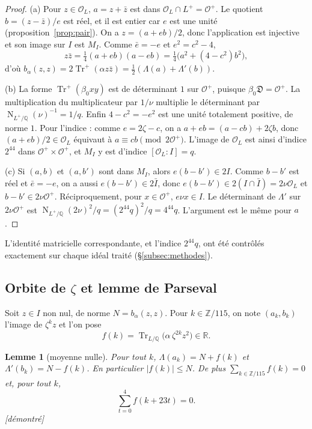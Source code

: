 \documentclass[11pt,a4paper]{amsart}
\theoremstyle{plain}
\newtheorem{lemme}[theoreme]{Lemme}
\theoremstyle{definition}
\numberwithin{equation}{section}
\newcommand{\Q}{\mathbb{Q}}
\newcommand{\Z}{\mathbb{Z}}
\newcommand{\R}{\mathbb{R}}
\newcommand{\OO}{\mathcal{O}}
\newcommand{\Op}{\mathcal{O}^{+}}
\newcommand{\Dif}{\mathfrak{D}}
\DeclareMathOperator{\Tr}{Tr}
\DeclareMathOperator{\Nm}{N}
\newcommand{\Trp}{\Tr^{+}}
\newcommand{\st}[1]{\textup{\textsf{\small[#1]}}}
\newcommand{\DEM}{\st{démontré}}
\begin{document}
\begin{proof}
(a) Pour $z\in\OO_L$, $a=z+\bar z$ est dans $\OO_L\cap L^+=\Op$. Le quotient $b=(z-\bar z)/e$ est réel, et il est entier car $e$ est une unité (proposition~\ref{prop:pair}). On a $z=(a+eb)/2$, donc l'application est injective et son image sur $I$ est $M_I$. Comme $\bar e=-e$ et $e^2=c^2-4$,
\[
z\bar z=\tfrac14(a+eb)(a-eb)=\tfrac14\bigl(a^2+(4-c^2)b^2\bigr),
\]
d'où $b_\alpha(z,z)=2\Trp(\alpha z\bar z)=\frac12(\Lambda(a)+\Lambda'(b))$.

(b) La forme $\Trp(\beta_0xy)$ est de déterminant $1$ sur $\Op$, puisque $\beta_0\Dif=\Op$. La multiplication du multiplicateur par $1/\nu$ multiplie le déterminant par $\Nm_{L^+/\Q}(\nu)^{-1}=1/q$. Enfin $4-c^2=-e^2$ est une unité totalement positive, de norme $1$. Pour l'indice : comme $e=2\zeta-c$, on a $a+eb=(a-cb)+2\zeta b$, donc $(a+eb)/2\in\OO_L$ équivaut à $a\equiv cb\pmod{2\Op}$. L'image de $\OO_L$ est ainsi d'indice $2^{44}$ dans $\Op\times\Op$, et $M_I$ y est d'indice $[\OO_L:I]=q$.

(c) Si $(a,b)$ et $(a,b')$ sont dans $M_I$, alors $e(b-b')\in2I$. Comme $b-b'$ est réel et $\bar e=-e$, on a aussi $e(b-b')\in2\bar I$, donc $e(b-b')\in2(I\cap\bar I)=2\nu\OO_L$ et $b-b'\in2\nu\Op$. Réciproquement, pour $x\in\Op$, $e\nu x\in I$. Le déterminant de $\Lambda'$ sur $2\nu\Op$ est $\Nm_{L^+/\Q}(2\nu)^2/q=(2^{44}q)^2/q=4^{44}q$. L'argument est le même pour $a$.
\end{proof}

L'identité matricielle correspondante, et l'indice $2^{44}q$, ont été contrôlés exactement sur chaque idéal traité (\S\ref{subsec:methodes}).

\subsection{Orbite de \texorpdfstring{$\zeta$}{zeta} et lemme de Parseval}
Soit $z\in I$ non nul, de norme $N=b_\alpha(z,z)$. Pour $k\in\Z/115$, on note $(a_k,b_k)$ l'image de $\zeta^kz$ et l'on pose
\[
f(k)=\Tr_{L/\Q}\bigl(\alpha\,\zeta^{2k}z^2\bigr)\in\R .
\]

\begin{lemme}[moyenne nulle]\label{lem:A}
Pour tout $k$, $\Lambda(a_k)=N+f(k)$ et $\Lambda'(b_k)=N-f(k)$. En particulier $|f(k)|\le N$. De plus $\sum_{k\in\Z/115}f(k)=0$ et, pour tout $k$,
\begin{equation}\label{eq:R5}
\sum_{t=0}^{4}f(k+23t)=0 .
\end{equation}
\DEM
\end{lemme}
\end{document}
